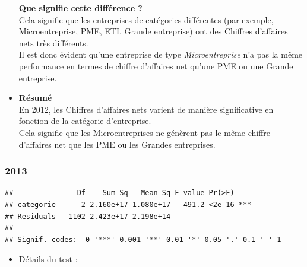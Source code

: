 \documentclass[mstat,12pt]{unswthesis}
\begin{document}
\begin{itemize}
  \textbf{Que signifie cette différence ?}\\
  Cela signifie que les entreprises de catégories différentes (par
  exemple, Microentreprise, PME, ETI, Grande entreprise) ont des
  Chiffres d'affaires nets très différents.\\
  Il est donc évident qu'une entreprise de type \emph{Microentreprise}
  n'a pas la même performance en termes de chiffre d'affaires net qu'une
  PME ou une Grande entreprise.
\item
  \textbf{Résumé}\\
  En 2012, les Chiffres d'affaires nets varient de manière significative
  en fonction de la catégorie d'entreprise.\\
  Cela signifie que les Microentreprises ne génèrent pas le même chiffre
  d'affaires net que les PME ou les Grandes entreprises.
\end{itemize}

\newpage

\subsubsection{\texorpdfstring{\textbf{2013}}{2013}}\label{section-1}

\medskip

\begin{verbatim}
##               Df    Sum Sq   Mean Sq F value Pr(>F)    
## categorie      2 2.160e+17 1.080e+17   491.2 <2e-16 ***
## Residuals   1102 2.423e+17 2.198e+14                   
## ---
## Signif. codes:  0 '***' 0.001 '**' 0.01 '*' 0.05 '.' 0.1 ' ' 1
\end{verbatim}

\medskip

\begin{itemize}
\tightlist
\item
  Détails du test :
\end{itemize}

\medskip
\end{document}
